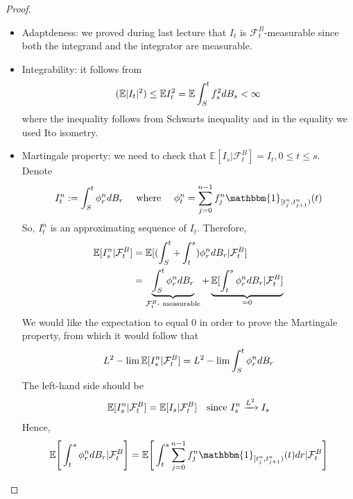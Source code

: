 \begin{proof}
    \begin{itemize}
        \item Adaptdeness: we proved during last lecture that $I_t$ is $\mathcal{F}_t^B$-measurable since both the integrand and the integrator are measurable. 
        \item Integrability: it follows from 
        \begin{equation*}
            (\mathbb{E}|I_t|^2) \leq \mathbb{E} I^2_t = \mathbb{E}\int_S^t f_s^2 dB_s < \infty
        \end{equation*}
        where the inequality follows from Schwarts inequality and in the equality we used Ito isometry. 
        \item Martingale property: we need to check that $\mathbb{E}[I_s|\mathcal{F}_t^B] = I_t, 0 \leq t \leq s$.\\
        Denote 
        \begin{equation*}
            I_t^n:= \int_S^t \phi_r^n dB_r \quad 
            \text{ where } \quad \phi_t^n = \sum_{j=0}^{n-1} f_j^n \mathbbm{1}_{[t_j^n, t_{j+1}^n)}(t)
        \end{equation*} 
        So, $I_t^n$ is an approximating sequence of $I_t$. Therefore,
        \begin{align*}
            \mathbb{E}[I_s^n|\mathcal{F}_t^B] &=\mathbb{E} [(\int_S^t + \int_t^s)\phi_r^n dB_r| \mathcal{F}_t^B] \\
            &= \underbrace{\int_S^t \phi_r^n dB_r }_{\mathcal{F}_t^B \text{- measurable}} + \underbrace{\mathbb{E}[\int_t^s \phi_r^n dB_r |\mathcal{F}_t^B]}_{= 0} 
        \end{align*}
        We would like the expectation to equal $0$ in order to prove the Martingale property, from which it would follow that
        \begin{equation*}
            L^2-\lim \mathbb{E}[I_s^n|\mathcal{F}_t ^B] = L^2-\lim \int_S^t \phi_r^n dB_r
        \end{equation*}
        The left-hand side should be 
        \begin{equation*}
            \mathbb{E}[I_s^n|\mathcal{F}_t^B] = \mathbb{E}[I_s|\mathcal{F}_t ^B] \quad\text{since  } I_s^n \xrightarrow{L^2} I_s
        \end{equation*}
        Hence,
        \begin{align*}
            \mE\Bigg[\int_t^s \phi_r^n dB_r |\mathcal{F}_t^B\Bigg] &= \mE\Bigg[\int_t^s \sum_{j=0}^{n-1} f_j^n \mathbbm{1}_{[t_j^n, t_{j+1}^n)}(t)dr|\mathcal{F}_t^B\Bigg] \\

\end{align*}
\end{itemize}
\end{proof}
